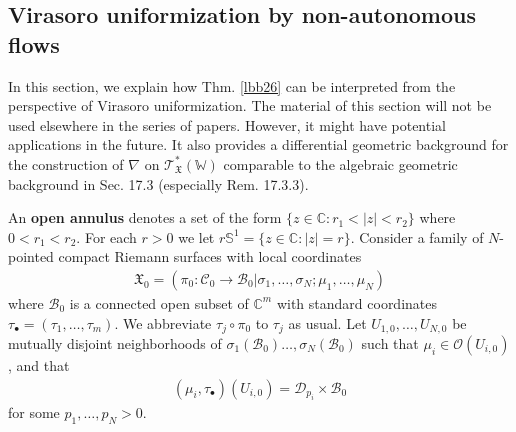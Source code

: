 \documentclass[11pt,b5paper,notitlepage]{article}
\theoremstyle{definition}
\theoremstyle{plain}
\newcommand{\mc}{\mathcal}
\newcommand{\Sbb}{\mathbb{S}}
\newcommand{\scr}{\mathscr}
\newcommand{\blt}{\bullet}
\newcommand{\Wbb}{\mathbb W}
\newcommand{\Cbb}{\mathbb C}
\newcommand{\<}{\left\langle}
\renewcommand{\>}{\right\rangle}
\newcommand{\MC}{\mathcal{C}}
\newcommand{\MB}{\mathcal{B}}
\newcommand{\fx}{\mathfrak{X}}
\numberwithin{equation}{subsection}
\begin{document}
\subsection{Virasoro uniformization by non-autonomous flows}\label{lbb67}


In this section, we explain how Thm. \ref{lbb26} can be interpreted from the perspective of Virasoro uniformization. The material of this section will not be used elsewhere in the series of papers. However, it might have potential applications in the future. It also provides a differential geometric background for the construction of $\nabla$ on $\scr T_{\fx}^*(\Wbb)$ comparable to the algebraic geometric background in \cite{FB04} Sec. 17.3 (especially Rem. 17.3.3).

An \textbf{open annulus} denotes a set of the form $\{z\in\Cbb:r_1<|z|<r_2\}$ where $0<r_1<r_2$. For each $r>0$ we let $r\Sbb^1=\{z\in\Cbb:|z|=r\}$. Consider a family of $N$-pointed compact Riemann surfaces with local coordinates
\begin{align*}
\fx_0=(\pi_0:\MC_0\rightarrow\MB_0|\sigma_1,\dots,\sigma_N;\mu_1,\dots,\mu_N )
\end{align*}
where $\MB_0$ is a connected open subset of $\Cbb^m$ with standard coordinates $\tau_\blt=(\tau_1,\dots,\tau_m)$. We abbreviate $\tau_j\circ\pi_0$ to $\tau_j$ as usual. Let $U_{1,0},\dots,U_{N,0}$ be mutually disjoint neighborhoods of $\sigma_1(\MB_0)\dots,\sigma_N(\MB_0)$ such that $\mu_i\in\mc O(U_{i,0})$, and that
\begin{align*}
(\mu_i,\tau_\blt)(U_{i,0})=\mc D_{p_i}\times\MB_0
\end{align*}
for some $p_1,\dots,p_N>0$.
\end{document}
